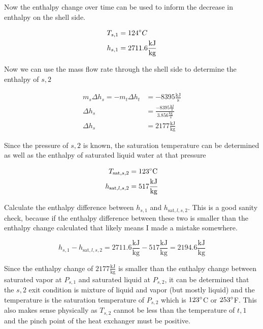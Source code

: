 \documentclass{article}
\begin{document}
Now the enthalpy change over time can be used to inform the decrease in enthalpy on the shell side.

\begin{align*}
    T_{s,1} &= 124 \degree C \\
    h_{s,1} &= 2711.6 \frac{\text{kJ}}{\text{kg}}
\end{align*}

Now we can use the mass flow rate through the shell side to determine the enthalpy of $s,2$

\begin{align}
    m_s \Delta h_s = -m_t \Delta h_t &= -8395 \frac{\text{kJ}}{\text{s}} \\
    \Delta h_s &= \frac{-8395 \frac{\text{kJ}}{\text{s}}}{3.856 \frac{\text{kg}}{\text{s}}} \\
    \Delta h_s &= 2177 \frac{\text{kJ}}{\text{kg}}
\end{align}

Since the pressure of $s,2$ is known, the saturation temperature can be determined as well as the enthalpy of saturated liquid water at that pressure

\begin{align*}
    T_{\text{sat},s,2} &= 123 \degree \text{C} \\
    h_{\text{sat},l,s,2} &= 517 \frac{\text{kJ}}{\text{kg}}
\end{align*}

Calculate the enthalpy difference between $h_{s,1}$ and $h_{\text{sat},l,s,2}$. This is a good sanity check, because if the enthalpy difference between these two is smaller than the enthalpy change calculated that likely means I made a mistake somewhere.

\begin{equation}
    h_{s,1} - h_{\text{sat},l,s,2} = 2711.6 \frac{\text{kJ}}{\text{kg}} - 517 \frac{\text{kJ}}{\text{kg}} = 2194.6 \frac{\text{kJ}}{\text{kg}}
\end{equation}

Since the enthalpy change of $2177 \frac{\text{kJ}}{\text{kg}}$ is smaller than the enthalpy change between saturated vapor at $P_{s,1}$ and saturated liquid at $P_{s,2}$, it can be determined that the $s,2$ exit condition is mixture of liquid and vapor (but mostly liquid) and the temperature is the saturation temperature of $P_{s,2}$ which is $123 \degree$C or $253 \degree$F. This also makes sense physically as $T_{s,2}$ cannot be less than the temperature of $t,1$ and the pinch point of the heat exchanger must be positive.
\end{document}
